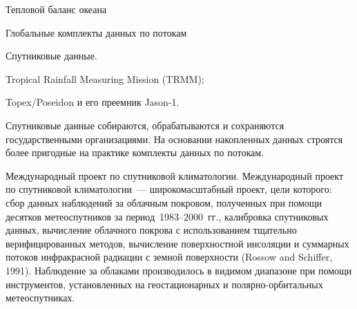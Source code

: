 \begin{chapter}{Тепловой баланс океана}
\begin{section}{Глобальные комплекты данных по потокам}
\begin{paragraph}{Спутниковые данные.}
\begin{enumparen}
\item 
Tropical Rainfall Measuring Mission (TRMM);
%

\item 
Topex/Poseidon и его преемник Jason-1.
%
\end{enumparen}

Спутниковые данные собираются, обрабатываются и сохраняются государственными
организациями. На основании накопленных данных строятся более пригодные на
практике комплекты данных по потокам.
%
\end{paragraph}

\begin{paragraph}{Международный проект по спутниковой климатологии.}
Международный проект по спутниковой климатологии~--- широкомасштабный проект,
цели которого: сбор данных наблюдений за облачным покровом, полученных при 
помощи десятков метеоспутников за период~1983--2000~гг., калибровка спутниковых
данных, вычисление облачного покрова с использованием тщательно 
верифицированных методов, вычисление поверхностной инсоляции и суммарных
потоков инфракрасной радиации с земной поверхности (Rossow and Schiffer, 1991).
Наблюдение за облаками производилось в видимом диапазоне при помощи 
инструментов, установленных на геостационарных и полярно-орбитальных 
метеоспутниках.
%
\end{paragraph}


\end{section}
\end{chapter}

